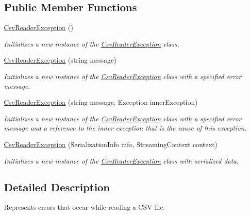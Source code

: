 \subsection*{Public Member Functions}
\begin{DoxyCompactItemize}
\item 
\hyperlink{a00058_a92ea35129f92f260c5327bbc3fd330df}{Csv\-Reader\-Exception} ()
\begin{DoxyCompactList}\small\item\em Initializes a new instance of the \hyperlink{a00058}{Csv\-Reader\-Exception} class. \end{DoxyCompactList}\item 
\hyperlink{a00058_abb4803417d6a479385872b608f1791e5}{Csv\-Reader\-Exception} (string message)
\begin{DoxyCompactList}\small\item\em Initializes a new instance of the \hyperlink{a00058}{Csv\-Reader\-Exception} class with a specified error message. \end{DoxyCompactList}\item 
\hyperlink{a00058_a4507583f079e40d454285c1e4f161aeb}{Csv\-Reader\-Exception} (string message, Exception inner\-Exception)
\begin{DoxyCompactList}\small\item\em Initializes a new instance of the \hyperlink{a00058}{Csv\-Reader\-Exception} class with a specified error message and a reference to the inner exception that is the cause of this exception. \end{DoxyCompactList}\item 
\hyperlink{a00058_aefa7020d5317878f91b9f43d3e1475be}{Csv\-Reader\-Exception} (Serialization\-Info info, Streaming\-Context context)
\begin{DoxyCompactList}\small\item\em Initializes a new instance of the \hyperlink{a00058}{Csv\-Reader\-Exception} class with serialized data. \end{DoxyCompactList}\end{DoxyCompactItemize}


\subsection{Detailed Description}
Represents errors that occur while reading a C\-S\-V file. 



